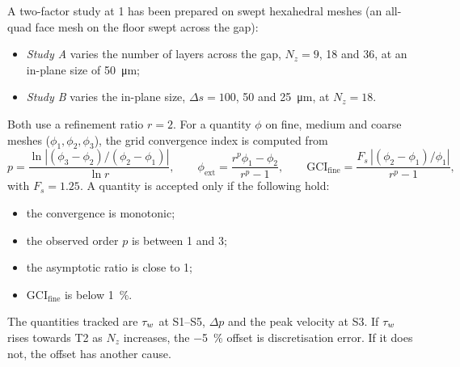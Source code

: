 A two-factor study at \SI{1}{\uLmin} has been prepared on swept hexahedral meshes (an all-quad face mesh on the floor swept across the gap):
\begin{itemize}
\item \emph{Study A} varies the number of layers across the gap, $N_z=9$, 18 and 36, at an in-plane size of \SI{50}{\micro\metre};
\item \emph{Study B} varies the in-plane size, $\Delta s=100$, 50 and \SI{25}{\micro\metre}, at $N_z=18$.
\end{itemize}
Both use a refinement ratio $r=2$. For a quantity $\phi$ on fine, medium and coarse meshes ($\phi_1,\phi_2,\phi_3$), the grid convergence index \citep{Roache1994,Celik2008} is computed from
\begin{equation}
p=\frac{\ln|(\phi_3-\phi_2)/(\phi_2-\phi_1)|}{\ln r},\qquad
\phi_{\mathrm{ext}}=\frac{r^p\phi_1-\phi_2}{r^p-1},\qquad
\mathrm{GCI}_{\mathrm{fine}}=\frac{F_s\,|(\phi_2-\phi_1)/\phi_1|}{r^p-1},
\label{eq:num_gci}
\end{equation}
with $F_s=1.25$. A quantity is accepted only if the following hold:
\begin{itemize}
\item the convergence is monotonic;
\item the observed order $p$ is between 1 and 3;
\item the asymptotic ratio is close to 1;
\item $\mathrm{GCI}_{\mathrm{fine}}$ is below \SI{1}{\percent}.
\end{itemize}
The quantities tracked are $\tau_{w}$ at S1--S5, $\Delta p$ and the peak velocity at S3. If $\tau_{w}$ rises towards T2 as $N_z$ increases, the \SI{-5}{\percent} offset is discretisation error. If it does not, the offset has another cause.
